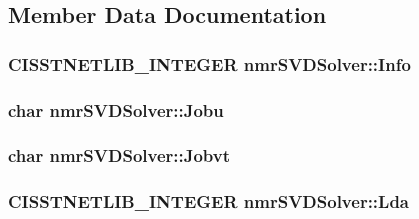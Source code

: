 \subsection{Member Data Documentation}
\hypertarget{classnmr_s_v_d_solver_a31d09d7a13b8917259c42edb13f6198a}{
\subsubsection[{Info}]{\setlength{\rightskip}{0pt plus 5cm}C\-I\-S\-S\-T\-N\-E\-T\-L\-I\-B\-\_\-\-I\-N\-T\-E\-G\-E\-R nmr\-S\-V\-D\-Solver\-::\-Info\hspace{0.3cm}{\ttfamily [protected]}}}\label{classnmr_s_v_d_solver_a31d09d7a13b8917259c42edb13f6198a}
\hypertarget{classnmr_s_v_d_solver_aa1cd31744f3929582fb5de43be96d3e9}{
\subsubsection[{Jobu}]{\setlength{\rightskip}{0pt plus 5cm}char nmr\-S\-V\-D\-Solver\-::\-Jobu\hspace{0.3cm}{\ttfamily [protected]}}}\label{classnmr_s_v_d_solver_aa1cd31744f3929582fb5de43be96d3e9}
\hypertarget{classnmr_s_v_d_solver_ac3ca9ed1369ecb4fcc73ccdb8f443029}{
\subsubsection[{Jobvt}]{\setlength{\rightskip}{0pt plus 5cm}char nmr\-S\-V\-D\-Solver\-::\-Jobvt\hspace{0.3cm}{\ttfamily [protected]}}}\label{classnmr_s_v_d_solver_ac3ca9ed1369ecb4fcc73ccdb8f443029}
\hypertarget{classnmr_s_v_d_solver_a3811b3b186d6b171c73bb905310e638c}{
\subsubsection[{Lda}]{\setlength{\rightskip}{0pt plus 5cm}C\-I\-S\-S\-T\-N\-E\-T\-L\-I\-B\-\_\-\-I\-N\-T\-E\-G\-E\-R nmr\-S\-V\-D\-Solver\-::\-Lda\hspace{0.3cm}{\ttfamily [protected]}}}\label{classnmr_s_v_d_solver_a3811b3b186d6b171c73bb905310e638c}
